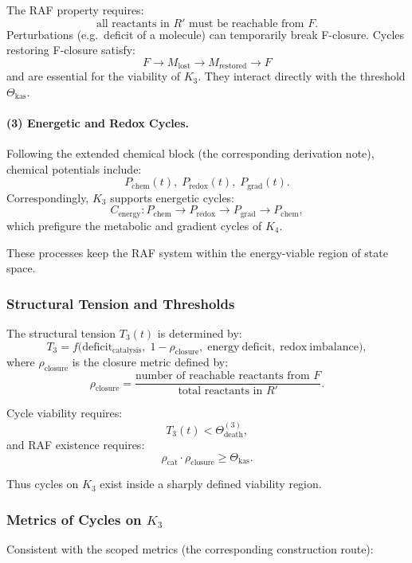 The RAF property requires:
\[
  \text{all reactants in } R' \text{ must be reachable from } F.
\]
Perturbations (e.g.\ deficit of a molecule) can temporarily break
F-closure.
Cycles restoring F-closure satisfy:
\[
  F \to M_{\mathrm{lost}} \to M_{\mathrm{restored}} \to F
\]
and are essential for the viability of $K_3$.
They interact directly with the threshold $\Theta_{\mathrm{kas}}$.

\paragraph{(3) Energetic and Redox Cycles.}

Following the extended chemical block (the corresponding derivation note),
chemical potentials include:
\[
  P_{\mathrm{chem}}(t),\;
  P_{\mathrm{redox}}(t),\;
  P_{\mathrm{grad}}(t).
\]
Correspondingly, $K_3$ supports energetic cycles:
\[
  C_{\mathrm{energy}}:
  P_{\mathrm{chem}}\to P_{\mathrm{redox}}
    \to P_{\mathrm{grad}} \to P_{\mathrm{chem}},
\]
which prefigure the metabolic and gradient cycles of $K_4$.

These processes keep the RAF system within the energy-viable region
of state space.

\subsubsection{Structural Tension and Thresholds}

The structural tension $T_3(t)$ is determined by:
\[
  T_3 =
   f\bigl(
     \mathrm{deficit}_{\mathrm{catalysis}},\;
     1-\rho_{\mathrm{closure}},\;
     \mathrm{energy\ deficit},\;
     \mathrm{redox\ imbalance}
   \bigr),
\]
where $\rho_{\mathrm{closure}}$ is the closure metric defined by:
\[
  \rho_{\mathrm{closure}} =
    \frac{\text{number of reachable reactants from } F}
         {\text{total reactants in } R'}.
\]

Cycle viability requires:
\[
  T_3(t) < \Theta_{\mathrm{death}}^{(3)},
\]
and RAF existence requires:
\[
  \rho_{\mathrm{cat}} \cdot \rho_{\mathrm{closure}}
  \ge \Theta_{\mathrm{kas}}.
\]

Thus cycles on $K_3$ exist inside a sharply defined viability region.

\subsubsection{Metrics of Cycles on \texorpdfstring{$K_3$}{K_3}}

Consistent with the scoped metrics (the corresponding construction route):

